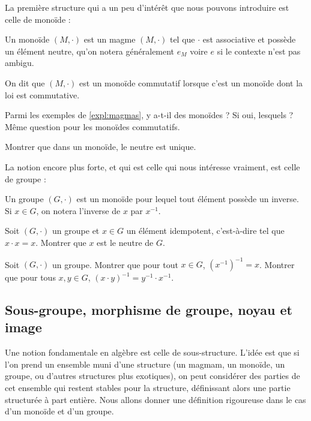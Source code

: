 La première structure qui a un peu d'intérêt que nous pouvons introduire est celle de monoïde :

\begin{defi}[Monoïde]
    Un monoïde $(M,\cdot)$ est un magme $(M,\cdot)$ tel que $\cdot$ est associative et possède un élément neutre, qu'on notera généralement $e_M$ voire $e$ si le contexte n'est pas ambigu.

    On dit que $(M,\cdot)$ est un monoïde commutatif lorsque c'est un monoïde dont la loi est commutative.
\end{defi}

\begin{exo}
    Parmi les exemples de \ref{expl:magmas}, y a-t-il des monoïdes ? Si oui, lesquels ? Même question pour les monoïdes commutatifs.
\end{exo}

\begin{exo}
    Montrer que dans un monoïde, le neutre est unique.
\end{exo}

La notion encore plus forte, et qui est celle qui nous intéresse vraiment, est celle de groupe :

\begin{defi}[Groupe]
    Un groupe $(G,\cdot)$ est un monoïde pour lequel tout élément possède un inverse. Si $x\in G$, on notera l'inverse de $x$ par $x^{-1}$.
\end{defi}

\begin{exo}
    Soit $(G,\cdot)$ un groupe et $x\in G$ un élément idempotent, c'est-à-dire tel que $x\cdot x = x$. Montrer que $x$ est le neutre de $G$.
\end{exo}

\begin{exo}
    Soit $(G,\cdot)$ un groupe. Montrer que pour tout $x\in G$, $(x^{-1})^{-1} = x$. Montrer que pour tous $x,y\in G$, $(x\cdot y)^{-1} = y^{-1}\cdot x^{-1}$.
\end{exo}

\subsection{Sous-groupe, morphisme de groupe, noyau et image}

Une notion fondamentale en algèbre est celle de sous-structure. L'idée est que si l'on prend un ensemble muni d'une structure (un magmam, un monoïde, un groupe, ou d'autres structures plus exotiques), on peut considérer des parties de cet ensemble qui restent stables pour la structure, définissant alors une partie structurée à part entière. Nous allons donner une définition rigoureuse dans le cas d'un monoïde et d'un groupe.

